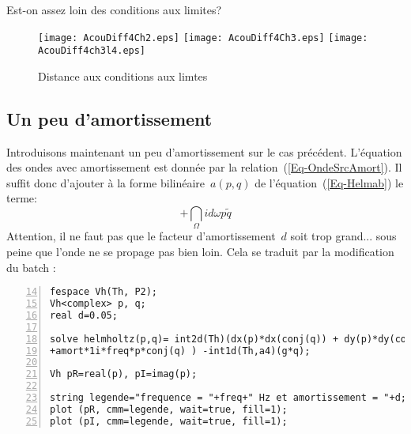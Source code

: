 Est-on assez loin des conditions aux limites?
\begin{flushright}
\end{flushright}
\begin{figure}[h!]
\centering
   \texttt{[image: AcouDiff4Ch2.eps]}\hfill
   \texttt{[image: AcouDiff4Ch3.eps]}\hfill
   \texttt{[image: AcouDiff4ch3l4.eps]}
\caption{Distance aux conditions aux limtes}\label{Fig-AcouDiff4Ch}
\end{figure}

\medskip
\subsection{Un peu d'amortissement}

Introduisons maintenant un peu d'amortissement sur le cas précédent. L'équation des ondes avec amortissement est donnée par la relation~(\ref{Eq-OndeSrcAmort}). Il suffit donc d'ajouter à la forme bilinéaire~$a(p,q)$ de l'équation~(\ref{Eq-Helmab}) le terme:
\begin{equation}
+\dint_\Omega id\omega p\tilde{q}
\end{equation}
Attention, il ne faut pas que le facteur d'amortissement~$d$ soit trop grand... sous peine que l'onde ne se propage pas bien loin. Cela se traduit par la modification du batch \freefem:
\scriptsize
\begin{Verbatim}[numbers=left,numbersep=3pt,firstnumber=14]
fespace Vh(Th, P2);
Vh<complex> p, q;
real d=0.05;

solve helmholtz(p,q)= int2d(Th)(dx(p)*dx(conj(q)) + dy(p)*dy(conj(q)) - k*k*p*conj(q) 
+amort*1i*freq*p*conj(q) ) -int1d(Th,a4)(g*q);

Vh pR=real(p), pI=imag(p);

string legende="frequence = "+freq+" Hz et amortissement = "+d;
plot (pR, cmm=legende, wait=true, fill=1);
plot (pI, cmm=legende, wait=true, fill=1);
\end{Verbatim}
\normalsize


